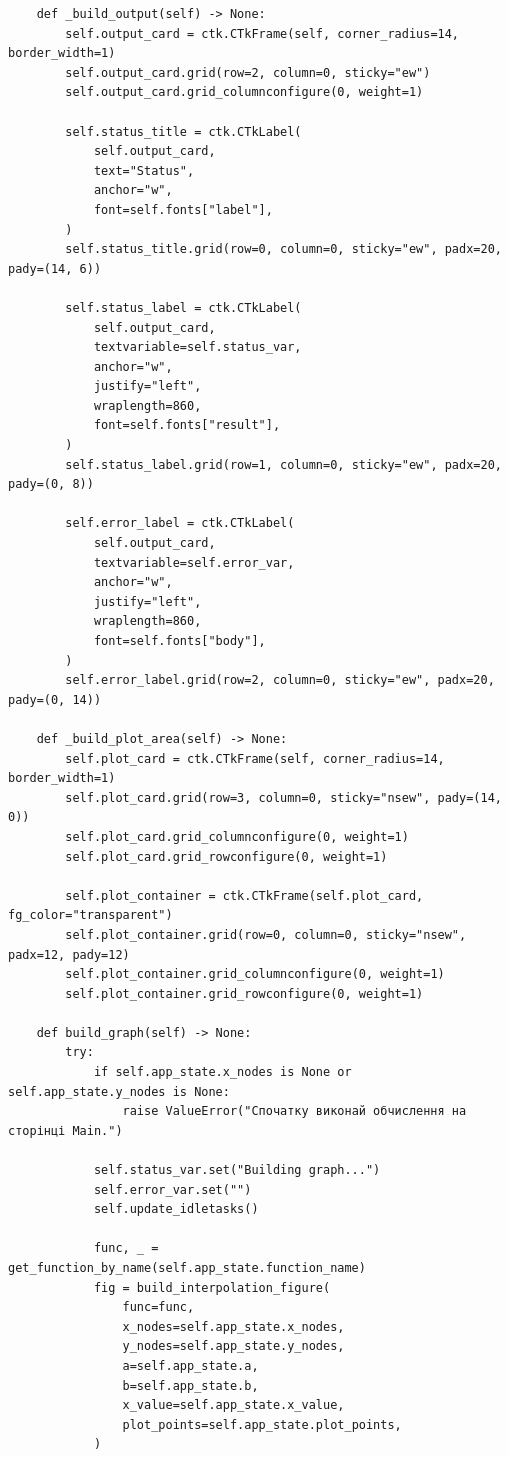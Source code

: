\documentclass[12pt,a4paper]{article}
\begin{document}
\begin{verbatim}
    def _build_output(self) -> None:
        self.output_card = ctk.CTkFrame(self, corner_radius=14, border_width=1)
        self.output_card.grid(row=2, column=0, sticky="ew")
        self.output_card.grid_columnconfigure(0, weight=1)

        self.status_title = ctk.CTkLabel(
            self.output_card,
            text="Status",
            anchor="w",
            font=self.fonts["label"],
        )
        self.status_title.grid(row=0, column=0, sticky="ew", padx=20, pady=(14, 6))

        self.status_label = ctk.CTkLabel(
            self.output_card,
            textvariable=self.status_var,
            anchor="w",
            justify="left",
            wraplength=860,
            font=self.fonts["result"],
        )
        self.status_label.grid(row=1, column=0, sticky="ew", padx=20, pady=(0, 8))

        self.error_label = ctk.CTkLabel(
            self.output_card,
            textvariable=self.error_var,
            anchor="w",
            justify="left",
            wraplength=860,
            font=self.fonts["body"],
        )
        self.error_label.grid(row=2, column=0, sticky="ew", padx=20, pady=(0, 14))

    def _build_plot_area(self) -> None:
        self.plot_card = ctk.CTkFrame(self, corner_radius=14, border_width=1)
        self.plot_card.grid(row=3, column=0, sticky="nsew", pady=(14, 0))
        self.plot_card.grid_columnconfigure(0, weight=1)
        self.plot_card.grid_rowconfigure(0, weight=1)

        self.plot_container = ctk.CTkFrame(self.plot_card, fg_color="transparent")
        self.plot_container.grid(row=0, column=0, sticky="nsew", padx=12, pady=12)
        self.plot_container.grid_columnconfigure(0, weight=1)
        self.plot_container.grid_rowconfigure(0, weight=1)

    def build_graph(self) -> None:
        try:
            if self.app_state.x_nodes is None or self.app_state.y_nodes is None:
                raise ValueError("Спочатку виконай обчислення на сторінці Main.")

            self.status_var.set("Building graph...")
            self.error_var.set("")
            self.update_idletasks()

            func, _ = get_function_by_name(self.app_state.function_name)
            fig = build_interpolation_figure(
                func=func,
                x_nodes=self.app_state.x_nodes,
                y_nodes=self.app_state.y_nodes,
                a=self.app_state.a,
                b=self.app_state.b,
                x_value=self.app_state.x_value,
                plot_points=self.app_state.plot_points,
            )


\end{verbatim}
\end{document}
